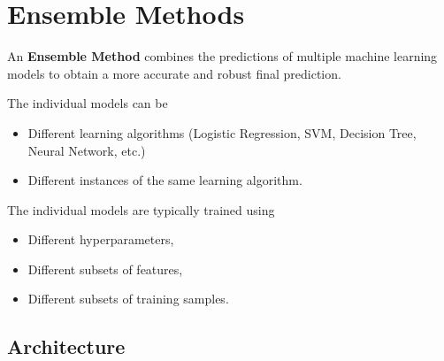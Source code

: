 \documentclass[11pt]{article}
\begin{document}
\section{Ensemble Methods}

An \textbf{Ensemble Method} combines the predictions of multiple machine
learning models to obtain a more accurate and robust final prediction.

The individual models can be

\begin{itemize}
	\item Different learning algorithms
	(Logistic Regression, SVM, Decision Tree, Neural Network, etc.)
	\item Different instances of the same learning algorithm.
\end{itemize}

The individual models are typically trained using

\begin{itemize}
	\item Different hyperparameters,
	\item Different subsets of features,
	\item Different subsets of training samples.
\end{itemize}

\subsection{Architecture}
\end{document}
